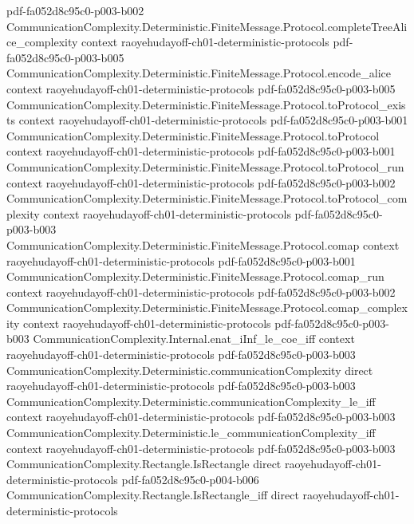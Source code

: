 \begin{theorem}
  {pdf-fa052d8c95c0-p003-b002}
\proofstep
  {CommunicationComplexity.Deterministic.FiniteMessage.Protocol.completeTreeAlice_complexity}
  {context}
  {raoyehudayoff-ch01-deterministic-protocols}
  {pdf-fa052d8c95c0-p003-b005}
\proofstep
  {CommunicationComplexity.Deterministic.FiniteMessage.Protocol.encode_alice}
  {context}
  {raoyehudayoff-ch01-deterministic-protocols}
  {pdf-fa052d8c95c0-p003-b005}
\proofstep
  {CommunicationComplexity.Deterministic.FiniteMessage.Protocol.toProtocol_exists}
  {context}
  {raoyehudayoff-ch01-deterministic-protocols}
  {pdf-fa052d8c95c0-p003-b001}
\proofstep
  {CommunicationComplexity.Deterministic.FiniteMessage.Protocol.toProtocol}
  {context}
  {raoyehudayoff-ch01-deterministic-protocols}
  {pdf-fa052d8c95c0-p003-b001}
\proofstep
  {CommunicationComplexity.Deterministic.FiniteMessage.Protocol.toProtocol_run}
  {context}
  {raoyehudayoff-ch01-deterministic-protocols}
  {pdf-fa052d8c95c0-p003-b002}
\proofstep
  {CommunicationComplexity.Deterministic.FiniteMessage.Protocol.toProtocol_complexity}
  {context}
  {raoyehudayoff-ch01-deterministic-protocols}
  {pdf-fa052d8c95c0-p003-b003}
\proofstep
  {CommunicationComplexity.Deterministic.FiniteMessage.Protocol.comap}
  {context}
  {raoyehudayoff-ch01-deterministic-protocols}
  {pdf-fa052d8c95c0-p003-b001}
\proofstep
  {CommunicationComplexity.Deterministic.FiniteMessage.Protocol.comap_run}
  {context}
  {raoyehudayoff-ch01-deterministic-protocols}
  {pdf-fa052d8c95c0-p003-b002}
\proofstep
  {CommunicationComplexity.Deterministic.FiniteMessage.Protocol.comap_complexity}
  {context}
  {raoyehudayoff-ch01-deterministic-protocols}
  {pdf-fa052d8c95c0-p003-b003}
\proofstep
  {CommunicationComplexity.Internal.enat_iInf_le_coe_iff}
  {context}
  {raoyehudayoff-ch01-deterministic-protocols}
  {pdf-fa052d8c95c0-p003-b003}
\proofstep
  {CommunicationComplexity.Deterministic.communicationComplexity}
  {direct}
  {raoyehudayoff-ch01-deterministic-protocols}
  {pdf-fa052d8c95c0-p003-b003}
\proofstep
  {CommunicationComplexity.Deterministic.communicationComplexity_le_iff}
  {context}
  {raoyehudayoff-ch01-deterministic-protocols}
  {pdf-fa052d8c95c0-p003-b003}
\proofstep
  {CommunicationComplexity.Deterministic.le_communicationComplexity_iff}
  {context}
  {raoyehudayoff-ch01-deterministic-protocols}
  {pdf-fa052d8c95c0-p003-b003}
\proofstep
  {CommunicationComplexity.Rectangle.IsRectangle}
  {direct}
  {raoyehudayoff-ch01-deterministic-protocols}
  {pdf-fa052d8c95c0-p004-b006}
\proofstep
  {CommunicationComplexity.Rectangle.IsRectangle_iff}
  {direct}
  {raoyehudayoff-ch01-deterministic-protocols}

\end{theorem}

